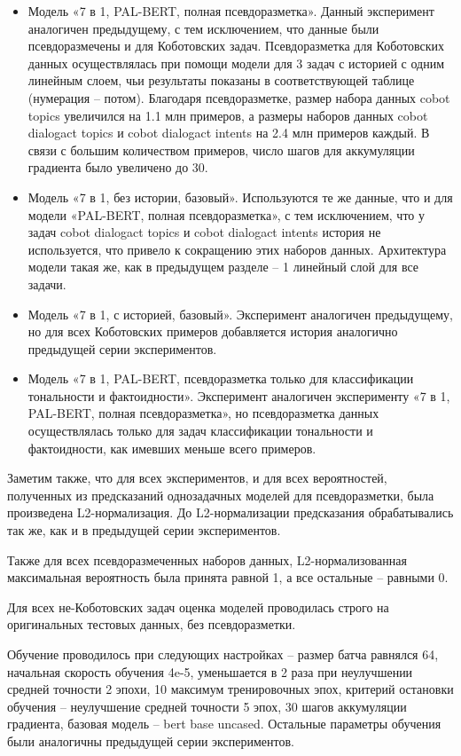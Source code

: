 \begin{itemize}
\item Модель «7 в 1, PAL-BERT, полная псевдоразметка». Данный эксперимент аналогичен предыдущему, с тем исключением, что данные были псевдоразмечены и для Коботовских задач. Псевдоразметка для Коботовских данных осуществлялась при помощи модели для 3 задач с историей с одним линейным слоем, чьи результаты показаны в соответствующей таблице (нумерация -- потом). Благодаря псевдоразметке, размер набора данных cobot topics увеличился на 1.1 млн примеров, а размеры наборов данных cobot dialogact topics и cobot dialogact intents на 2.4 млн примеров каждый. В связи с большим количеством примеров, число шагов для аккумуляции градиента было увеличено до 30.

\item Модель «7 в 1, без истории, базовый». Используются те же данные, что и для модели «PAL-BERT, полная псевдоразметка», с тем исключением, что у задач cobot dialogact topics и cobot dialogact intents история не используется, что привело к сокращению этих наборов данных. Архитектура модели такая же, как в предыдущем разделе -- 1 линейный слой для все задачи.

\item Модель «7 в 1, с историей, базовый». Эксперимент аналогичен предыдущему, но для всех Коботовских примеров добавляется история аналогично предыдущей серии экспериментов.

\item Модель «7 в 1, PAL-BERT, псевдоразметка только для классификации тональности и фактоидности». Эксперимент аналогичен эксперименту «7 в 1, PAL-BERT, полная псевдоразметка», но псевдоразметка данных осуществлялась только для задач классификации тональности и фактоидности, как имевших меньше всего примеров.

\end{itemize}
Заметим также, что для всех экспериментов, и для всех вероятностей, полученных из предсказаний однозадачных моделей для псевдоразметки, была произведена L2-нормализация. До L2-нормализации предсказания обрабатывались так же, как и в предыдущей серии экспериментов.

Также для всех псевдоразмеченных наборов данных, L2-нормализованная максимальная вероятность была принята равной 1, а все остальные -- равными 0.

Для всех не-Коботовских задач оценка моделей проводилась строго на оригинальных тестовых данных, без псевдоразметки.

Обучение проводилось при следующих настройках -- размер батча равнялся 64, начальная скорость обучения 4e-5, уменьшается в 2 раза при неулучшении средней точности 2 эпохи, 10 максимум тренировочных эпох, критерий остановки обучения -- неулучшение средней точности 5 эпох, 30 шагов аккумуляции градиента, базовая модель -- bert base uncased. Остальные параметры обучения были аналогичны предыдущей серии экспериментов.

